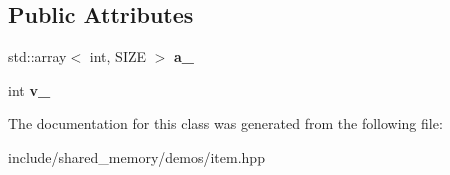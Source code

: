 \subsection*{Public Attributes}
\begin{DoxyCompactItemize}
\item 
std\+::array$<$ int, S\+I\+ZE $>$ {\bfseries a\+\_\+}\hypertarget{classshared__memory_1_1Item_a3cb46d7a9776f0512cc8c3689278440b}{}\label{classshared__memory_1_1Item_a3cb46d7a9776f0512cc8c3689278440b}

\item 
int {\bfseries v\+\_\+}\hypertarget{classshared__memory_1_1Item_acd5944f0e62324ef0dc71b91ef9d7054}{}\label{classshared__memory_1_1Item_acd5944f0e62324ef0dc71b91ef9d7054}

\end{DoxyCompactItemize}


The documentation for this class was generated from the following file\+:\begin{DoxyCompactItemize}
\item 
include/shared\+\_\+memory/demos/item.\+hpp\end{DoxyCompactItemize}

